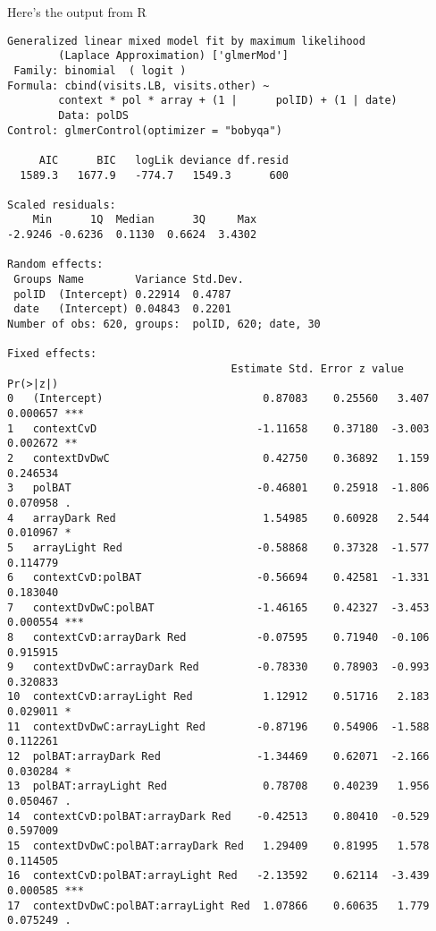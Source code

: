 \documentclass{article}
\begin{document}
Here's the output from R
\begin{verbatim}
Generalized linear mixed model fit by maximum likelihood 
		(Laplace Approximation) ['glmerMod']
 Family: binomial  ( logit )
Formula: cbind(visits.LB, visits.other) ~ 
		context * pol * array + (1 |      polID) + (1 | date)
   		Data: polDS
Control: glmerControl(optimizer = "bobyqa")

     AIC      BIC   logLik deviance df.resid 
  1589.3   1677.9   -774.7   1549.3      600 

Scaled residuals: 
    Min      1Q  Median      3Q     Max 
-2.9246 -0.6236  0.1130  0.6624  3.4302 

Random effects:
 Groups Name        Variance Std.Dev.
 polID  (Intercept) 0.22914  0.4787  
 date   (Intercept) 0.04843  0.2201  
Number of obs: 620, groups:  polID, 620; date, 30

Fixed effects:
                                   Estimate Std. Error z value Pr(>|z|)    
0	(Intercept)                         0.87083    0.25560   3.407 0.000657 ***
1 	contextCvD                         -1.11658    0.37180  -3.003 0.002672 ** 
2	contextDvDwC                        0.42750    0.36892   1.159 0.246534    
3	polBAT                             -0.46801    0.25918  -1.806 0.070958 .  
4	arrayDark Red                       1.54985    0.60928   2.544 0.010967 *  
5	arrayLight Red                     -0.58868    0.37328  -1.577 0.114779    
6	contextCvD:polBAT                  -0.56694    0.42581  -1.331 0.183040    
7	contextDvDwC:polBAT                -1.46165    0.42327  -3.453 0.000554 ***
8	contextCvD:arrayDark Red           -0.07595    0.71940  -0.106 0.915915    
9	contextDvDwC:arrayDark Red         -0.78330    0.78903  -0.993 0.320833    
10	contextCvD:arrayLight Red           1.12912    0.51716   2.183 0.029011 *  
11	contextDvDwC:arrayLight Red        -0.87196    0.54906  -1.588 0.112261    
12	polBAT:arrayDark Red               -1.34469    0.62071  -2.166 0.030284 *  
13	polBAT:arrayLight Red               0.78708    0.40239   1.956 0.050467 .  
14	contextCvD:polBAT:arrayDark Red    -0.42513    0.80410  -0.529 0.597009    
15	contextDvDwC:polBAT:arrayDark Red   1.29409    0.81995   1.578 0.114505    
16	contextCvD:polBAT:arrayLight Red   -2.13592    0.62114  -3.439 0.000585 ***
17	contextDvDwC:polBAT:arrayLight Red  1.07866    0.60635   1.779 0.075249 . 

\end{verbatim}
\end{document}
